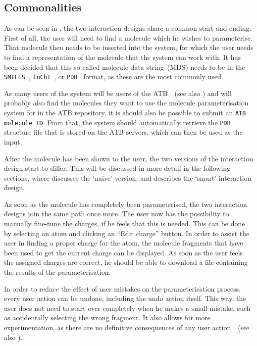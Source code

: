 \subsection{Commonalities}
As can be seen in , the two interaction designs share a common start and ending. First of all, the user will need to find a molecule which he wishes to parameterise. That molecule then needs to be inserted into the system, for which the user needs to find a representation of the molecule that the system can work with. It has been decided that this so called molecule data string~(MDS) needs to be in the \verb|SMILES|~\cite{daylight1992daylight}, \verb|InChI|~\cite{heller2013inchi}, or \verb|PDB|~\cite{bernstein1977protein} format, as these are the most commonly used.

As many users of the system will be users of the ATB~\cite{malde2011automated}~(see also ) and will probably also find the molecules they want to use the molecule parameterisation system for in the ATB repository, it is should also be possible to submit an \verb|ATB molecule ID|. From that, the system should automatically retrieve the \verb|PDB| structure file that is stored on the ATB servers, which can then be used as the input.

After the molecule has been shown to the user, the two versions of the interaction design start to differ. This will be discussed in more detail in the following sections, where  discusses the `naive' version, and  describes the `smart' interaction design.

As soon as the molecule has completely been parameterised, the two interaction designs join the same path once more. The user now has the possibility to manually fine-tune the charges, if he feels that this is needed. This can be done by selecting an atom and clicking an ``Edit charge'' button. In order to assist the user in finding a proper charge for the atom, the molecule fragments that have been used to get the current charge can be displayed. As soon as the user feels the assigned charges are correct, he should be able to download a file containing the results of the parameterisation.

In order to reduce the effect of user mistakes on the parameterisation process, every user action can be undone, including the undo action itself. This way, the user does not need to start over completely when he makes a small mistake, such as accidentally selecting the wrong fragment. It also allows for more experimentation, as there are no definitive consequences of any user action~\cite{norman2002design,norman2010gestural}~(see also ).


